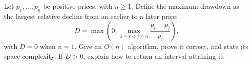 Let $p_1,\ldots,p_n$ be positive prices, with $n\ge1$. Define the maximum drawdown as the largest relative decline from an earlier to a later price:
\[
 D=\max\left(0,\max_{1\le i<j\le n}\frac{p_i-p_j}{p_i}\right),
\]
with $D=0$ when $n=1$. Give an $O(n)$ algorithm, prove it correct, and state its space complexity. If $D>0$, explain how to return an interval attaining it.
